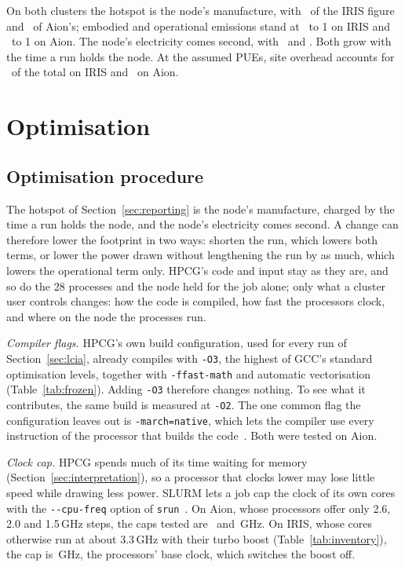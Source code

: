 \documentclass[conference,a4paper]{IEEEtran}
\begin{document}
On both clusters the hotspot is the node's manufacture, with \IrisShareEmb\ of
the IRIS figure and \AionShareEmb\ of Aion's; embodied and operational emissions
stand at \IrisEmbOpRatio\ to 1 on IRIS and \AionEmbOpRatio\ to 1 on Aion. The
node's electricity comes second, with \IrisShareNode\ and \AionShareNode. Both
grow with the time a run holds the node. At the assumed PUEs, site overhead
accounts for \IrisShareSite\ of the total on IRIS and \AionShareSite\ on Aion.

\section{Optimisation}\label{sec:optimisation}

\subsection{Optimisation procedure}\label{sec:optproc}

The hotspot of Section~\ref{sec:reporting} is the node's manufacture, charged by
the time a run holds the node, and the node's electricity comes second. A change
can therefore lower the footprint in two ways: shorten the run, which lowers both
terms, or lower the power drawn without lengthening the run by as much, which
lowers the operational term only. HPCG's code and input stay as they are, and so
do the 28 processes and the node held for the job alone; only what a cluster user
controls changes: how the code is compiled, how fast the processors clock, and
where on the node the processes run.

\emph{Compiler flags.} HPCG's own build configuration, used for every run of
Section~\ref{sec:lcia}, already compiles with \texttt{-O3}, the highest of GCC's
standard optimisation levels, together with \texttt{-ffast-math} and automatic
vectorisation~\cite{gcc-optimize} (Table~\ref{tab:frozen}). Adding
\texttt{-O3} therefore changes nothing. To see what it contributes, the same
build is measured at \texttt{-O2}. The one common flag the configuration leaves
out is \texttt{-march=native}, which lets the compiler use every instruction of
the processor that builds the code~\cite{gcc-x86}. Both were tested on Aion.

\emph{Clock cap.} HPCG spends much of its time waiting for memory
(Section~\ref{sec:interpretation}), so a processor that clocks lower may lose
little speed while drawing less power. SLURM lets a job cap the clock of its
own cores with the \texttt{-{}-cpu-freq} option of \texttt{srun}~\cite{slurm-srun}.
On Aion, whose processors offer only 2.6, 2.0 and 1.5\,GHz steps, the caps tested
are \AionCapA\ and \AionCapB\,GHz. On IRIS, whose cores otherwise run at about
3.3\,GHz with their turbo boost (Table~\ref{tab:inventory}), the cap is
\IrisCapA\,GHz, the processors' base clock, which switches the boost off.
\end{document}
